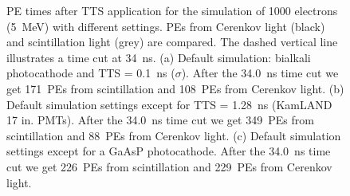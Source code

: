 \documentclass[aps,prc,twocolumn,groupedaddress,showpacs,amsmath,amssymb,floatfix,superscriptaddress]{revtex4}
\begin{document}
\begin{figure}[tbh]
\begin{center}
        \caption[]{PE times after TTS application for the simulation of 1000 electrons (5~MeV) with different settings. PEs from Cerenkov light (black) and scintillation light (grey) are compared. The dashed vertical line illustrates a time cut at 34~ns. (a) Default simulation: bialkali photocathode and TTS = 0.1~ns ($\sigma$). After the 34.0~ns time cut we get 171~PEs from scintillation and 108~PEs from Cerenkov light. (b) Default simulation settings except for TTS = 1.28~ns (KamLAND 17 in. PMTs). After the 34.0~ns time cut we get 349~PEs from scintillation and 88~PEs from Cerenkov light. (c) Default simulation settings except for a GaAsP photocathode. After the 34.0~ns time cut we get 226~PEs from scintillation and 229~PEs from Cerenkov light. \label{time_plots_comparison}}
        \end{center}
\end{figure}
\end{document}
